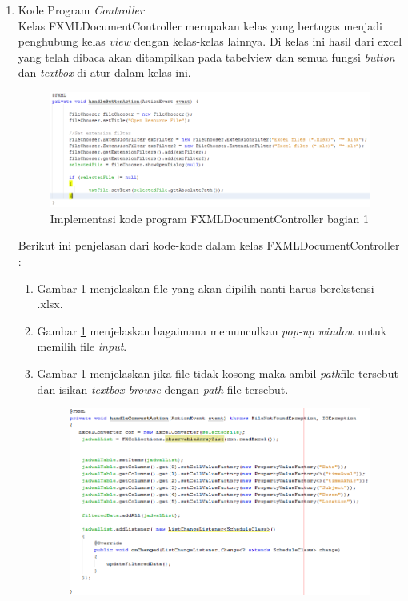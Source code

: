 \begin{enumerate}
\item Kode Program \textit{Controller} \\
Kelas FXMLDocumentController merupakan kelas yang bertugas menjadi penghubung kelas \textit{view} dengan kelas-kelas lainnya. Di kelas ini hasil dari excel yang telah dibaca akan ditampilkan pada tabelview dan semua fungsi \textit{button} dan  \textit{textbox} di atur dalam kelas ini. \\
\begin{figure}[H]
		\centering
		\includegraphics[scale=0.7]{Gambar/controller1}
		\caption{Implementasi kode program FXMLDocumentController bagian 1}
		\label{fig:controller1}
\end{figure}
Berikut ini penjelasan dari kode-kode dalam kelas FXMLDocumentController :
\begin{enumerate}
	\item Gambar \ref{fig:controller1} menjelaskan file yang akan dipilih nanti harus berekstensi .xlsx.
	\item Gambar \ref{fig:controller1} menjelaskan bagaimana memunculkan \textit{pop-up window} untuk memilih file \textit{input}.
	\item Gambar \ref{fig:controller1} menjelaskan jika file tidak kosong maka ambil \textit{path}file tersebut dan isikan \textit{textbox browse} dengan \textit{path} file tersebut.
	\begin{figure}[H]
		\centering
		\includegraphics[scale=0.7]{Gambar/controller2}

\end{figure}
\end{enumerate}
\end{enumerate}
